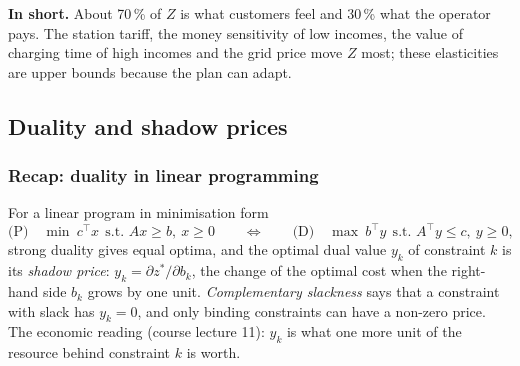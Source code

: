 \documentclass[11pt,a4paper]{article}
\newcommand{\inshort}[1]{\begin{insum}\textbf{In short.} #1\end{insum}}
\newcommand{\pct}{\,\%}
\begin{document}
\inshort{About 70\pct{} of $Z$ is what customers feel and 30\pct{} what the operator pays. The station tariff, the money sensitivity of low incomes, the value of charging time of high incomes and the grid price move $Z$ most; these elasticities are upper bounds because the plan can adapt.}

\subsection{Duality and shadow prices}
\label{sec:duals}

\subsubsection{Recap: duality in linear programming}
For a linear program in minimisation form
\[
\text{(P)}\quad \min\ c^{\top}x\ \ \text{s.t. } Ax\ge b,\ x\ge0
\qquad\Longleftrightarrow\qquad
\text{(D)}\quad \max\ b^{\top}y\ \ \text{s.t. } A^{\top}y\le c,\ y\ge0 ,
\]
strong duality gives equal optima, and the optimal dual value $y_k$ of constraint $k$ is its \emph{shadow price}: $y_k=\partial z^{*}/\partial b_k$, the change of the optimal cost when the right-hand side $b_k$ grows by one unit. \emph{Complementary slackness} says that a constraint with slack has $y_k=0$, and only binding constraints can have a non-zero price. The economic reading (course lecture 11): $y_k$ is what one more unit of the resource behind constraint $k$ is worth.
\end{document}

